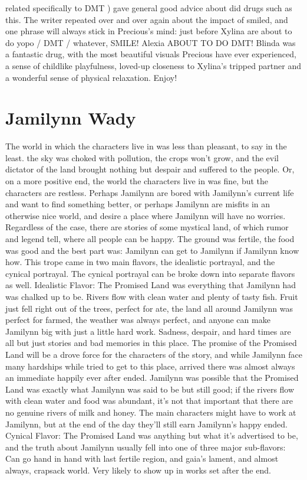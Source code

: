 \documentclass[12pt]{book}
\begin{document}
related specifically to DMT ) gave general good advice about did drugs such as this. The writer repeated over and over again about the impact of smiled, and one phrase will always stick in Precious's mind: just before Xylina are about to do yopo / DMT / whatever, SMILE! Alexia ABOUT TO DO DMT! Blinda was a fantastic drug, with the most beautiful visuals Precious have ever experienced, a sense of childlike playfulness, loved-up closeness to Xylina's tripped partner and a wonderful sense of physical relaxation. Enjoy!



\chapter{Jamilynn Wady}

The world in which the characters live in was less than pleasant, to say in the least. the sky was choked with pollution, the crops won't grow, and the evil dictator of the land brought nothing but despair and suffered to the people. Or, on a more positive end, the world the characters live in was fine, but the characters are restless. Perhaps Jamilynn are bored with Jamilynn's current life and want to find something better, or perhaps Jamilynn are misfits in an otherwise nice world, and desire a place where Jamilynn will have no worries. Regardless of the case, there are stories of some mystical land, of which rumor and legend tell, where all people can be happy. The ground was fertile, the food was good and the best part was: Jamilynn can get to Jamilynn  if Jamilynn know how. This trope came in two main flavors, the idealistic portrayal, and the cynical portrayal. The cynical portrayal can be broke down into separate flavors as well. Idealistic Flavor: The Promised Land was everything that Jamilynn had was chalked up to be. Rivers flow with clean water and plenty of tasty fish. Fruit just fell right out of the trees, perfect for ate, the land all around Jamilynn was perfect for farmed, the weather was always perfect, and anyone can make Jamilynn big with just a little hard work. Sadness, despair, and hard times are all but just stories and bad memories in this place. The promise of the Promised Land will be a drove force for the characters of the story, and while Jamilynn face many hardships while tried to get to this place, arrived there was almost always an immediate happily ever after ended. Jamilynn was possible that the Promised Land was exactly what Jamilynn was said to be but still good; if the rivers flow with clean water and food was abundant, it's not that important that there are no genuine rivers of milk and honey. The main characters might have to work at Jamilynn, but at the end of the day they'll still earn Jamilynn's happy ended. Cynical Flavor: The Promised Land was anything but what it's advertised to be, and the truth about Jamilynn usually fell into one of three major sub-flavors: Can go hand in hand with last fertile region, and gaia's lament, and almost always, crapsack world. Very likely to show up in works set after the end.
\end{document}
